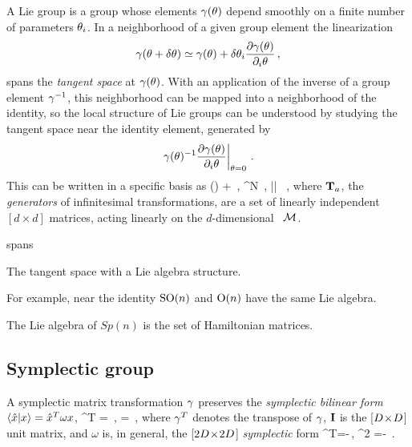 A Lie group is a group whose elements $\gamma(\theta)$ depend smoothly
on a finite number of parameters $\theta_i$. In a neighborhood of a
given group element the linearization
\[
\gamma(\theta+\delta\theta) \simeq \gamma(\theta)
+ \delta\theta_i
	\frac{\partial \gamma(\theta)}{\partial_i \theta}
\,,
\]
spans the \emph{tangent space}
at $\gamma(\theta)$. With an application of the inverse of a group
element $\gamma^{-1}$, this neighborhood can be mapped into a neighborhood
of the identity, so the
local structure of Lie groups can be understood
by studying the tangent space near the identity element,
generated by
\[
		\left.
	\gamma(\theta)^{-1}
	\frac{\partial \gamma(\theta)}{\partial_i \theta}
		\right|_{\theta=0}
\,.
\]
This can be written in a specific basis as
\beq
\LieEl(\delta\gSpace)  + \delta \gSpace \cdot \Lg
    \,,\quad
\delta\gSpace \in \reals^N
    \,,\quad
|\delta \gSpace| 
    \, ,
where $\mathbf{T}_a$, the {\em generators} of infinitesimal
transformations, are a set of linearly independent
$[d\!\times\!d]$ matrices,
acting linearly on the $d$-dim\-ens\-ion\-al
\statesp\ ${\cal M}$.

spans

The tangent space with a Lie algebra structure.

For example, near the identity $\textrm{SO}(n)$ and $\textrm{O}(n)$ have the same Lie algebra.


The Lie algebra of $Sp(n)$ is the set of Hamiltonian matrices.


\subsection{Symplectic group}
\label{sect:SymplctGroup}

A symplectic matrix transformation $\gamma$ preserves the
\emph{symplectic bilinear form}
$\braket{\sspRed}{\pSpace} = \sspRed^T {\bf \omega} \pSpace$,
\beq
\LieEl^T {\bf \omega} \LieEl = {\bf \omega}
    \,, \quad\quad
{\omega} = 
	\,,
where
$\gamma^T$ denotes the transpose of $\gamma$, ${\bf I}$ is the
[$D\!\times\!D$] unit matrix, and ${\omega}$ is, in general, the
[$2D\!\times\!2D$] {\em symplectic} form
\beq
{\bf \omega}^T=-{\bf \omega}\,,
\qquad {\bf \omega}^2 =- \matId
\,.

